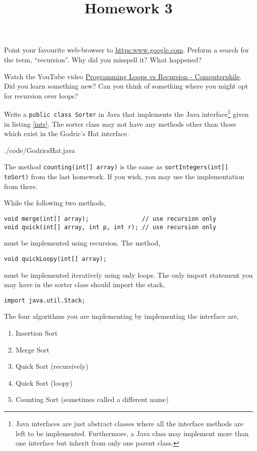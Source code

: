 \documentclass{homework}
\title{Homework 3}
\newcommand\computerphile{\href{%
    https://www.youtube.com/watch?v=HXNhEYqFo0o%
  }{Programming Loops vs Recursion - Computerphile}}
\begin{document}
 \maketitle

\question Point your favourite web-browser to \url{https:www.google.com}.
Perform a search for the term, ``recursion''. Why did you misspell
it? What happened?

\question\label{vid} Watch the YouTube video \computerphile. Did you
learn something new? Can you think of something where you might opt
for recursion over loops?

\question Write a \texttt{public class Sorter} in Java that implements the
Java interface\footnote{Java interfaces are just abstract classes
  where all the interface methods are left to be implemented.
  Furthermore, a Java class may implement more than one interface
  but inherit from only one parent class.} given in listing
\ref{intr}. The sorter class may not have any methods other than
those which exist in the Godric's Hat interface.


{./code/GodricsHat.java}

The method \texttt{counting(int[] array)} is the same as
\texttt{sortIntegers(int[] toSort)} from the last homework. If you
wish, you may use the implementation from there.

While the following two methods,

\begin{verbatim}
void merge(int[] array);               // use recursion only
void quick(int[] array, int p, int r); // use recursion only
\end{verbatim}

must be implemented using recursion. The method,

\begin{verbatim}
void quickLoopy(int[] array);
\end{verbatim}

must be implemented iteratively \ie using only loops. The only
import statement you may have in the sorter class should import
the stack,

\begin{verbatim}
import java.util.Stack;
\end{verbatim}

The four algorithms you are implementing by implementing the
interface are,

\begin{enumerate}
  \item Insertion Sort
  \item Merge Sort
  \item Quick Sort (recursively)
  \item Quick Sort (loopy)
  \item Counting Sort (sometimes called a different name)
\end{enumerate}
\end{document}
